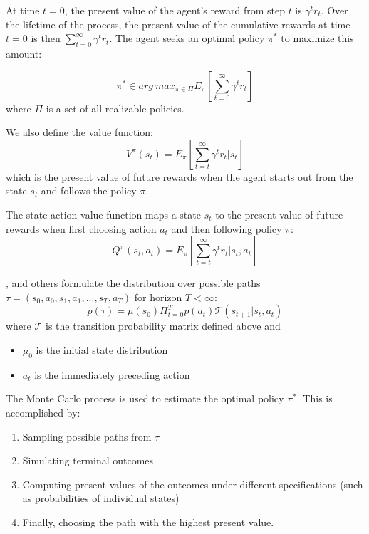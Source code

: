 \documentclass{wscpaperproc}
\theoremstyle{wsc}
\begin{document}
 At time $t=0$, the present value of the agent's reward from step $t$ is $\gamma^t r_t$.  Over the lifetime of the process, the present value of the cumulative rewards at time $t=0$ is then $\sum_{t=0}^{\infty}\gamma^t r_t$. The agent seeks an optimal policy $\pi^*$ to maximize this amount:
 
 \begin{equation}
     \pi^*\in arg \:max_{\pi\in\Pi} E_\pi \left[\sum_{t=0}^{\infty}\gamma^t r_t\right]
 \end{equation}
where $\Pi$ is a set of all realizable policies. 

We also define the value function:
\begin{equation}
    V^\pi(s_t) = E_\pi \left[\sum_{t=t}^{\infty}\gamma^t r_t|s_t\right]
\end{equation}
which is the present value of future rewards when the agent starts out from the state $s_t$ and follows the policy $\pi$.

The state-action value function maps a state $s_t$ to the present value of future rewards when first choosing action $a_t$ and then following policy $\pi$:
\begin{equation}
    Q^\pi(s_t, a_t) = E_\pi \left[\sum_{t=t}^{\infty}\gamma^t r_t|s_t, a_t\right]
\end{equation}

,  and others formulate the distribution over possible paths $\tau=(s_0,a_0, s_1,a_1,...,s_T,a_T)$ for horizon $T <\infty$:
\begin{equation}
    p(\tau)=\mu(s_0)\Pi_{t=0}^Tp(a_t)\mathcal{T}(s_{t+1}|s_t,a_t)
\end{equation}
where $\mathcal{T}$ is the transition probability matrix defined above and
\begin{itemize}
    \item $\mu_0$ is the initial state distribution 
    \item $a_t$ is the immediately preceding action 
\end{itemize}

The Monte Carlo process is used to estimate the optimal policy $\pi^*$. This is accomplished by:
\begin{enumerate}
    \item Sampling possible paths from \textbf{$\tau$}
    \item Simulating terminal outcomes
    \item Computing present values of the outcomes under different specifications (such as probabilities of individual states)
    \item Finally, choosing the path with the highest present value.
\end{enumerate}
\end{document}
